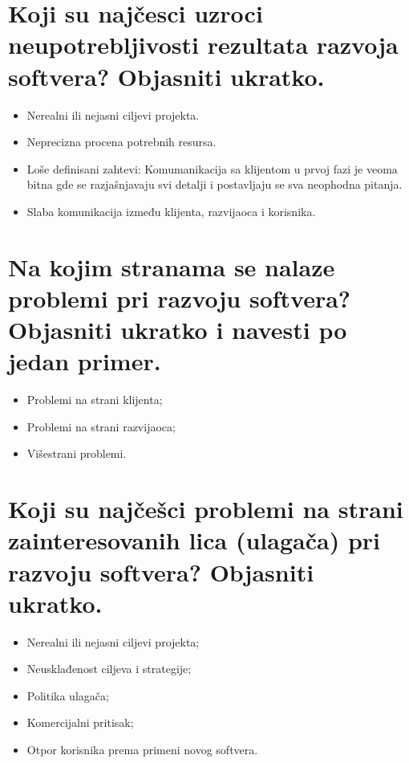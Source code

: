 \documentclass[a4paper]{article}
\begin{document}
\section{Koji su najčesci uzroci neupotrebljivosti rezultata razvoja softvera? Objasniti ukratko.}
  \begin{itemize}
    \item Nerealni ili nejasni ciljevi projekta.
    \item Neprecizna procena potrebnih resursa.
    \item Loše definisani zahtevi: Komumanikacija sa klijentom u prvoj fazi je veoma bitna gde se
          razjašnjavaju svi detalji i postavljaju se sva neophodna pitanja.
    \item Slaba komunikacija između klijenta, razvijaoca i korisnika.
  \end{itemize}

\section{Na kojim stranama se nalaze problemi pri razvoju softvera? Objasniti ukratko i navesti 
         po jedan primer.}
    \begin{itemize}
      \item Problemi na strani klijenta;
      \item Problemi na strani razvijaoca;
      \item Višestrani problemi.
    \end{itemize}

\section{Koji su najčešci problemi na strani zainteresovanih lica (ulagača) pri razvoju softvera? 
         Objasniti ukratko.}
    \begin{itemize}
      \item Nerealni ili nejasni ciljevi projekta;
      \item Neusklađenost ciljeva i strategije;
      \item Politika ulagača;
      \item Komercijalni pritisak;
      \item Otpor korisnika prema primeni novog softvera.
    \end{itemize}
\end{document}
